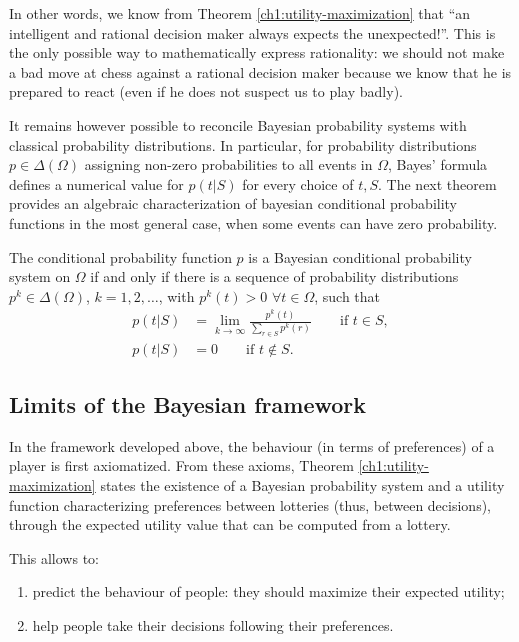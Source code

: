 In other words, we know from Theorem \ref{ch1:utility-maximization} that ``an intelligent and rational decision maker always expects the unexpected!''.
This is the only possible way to mathematically express rationality: we should not make a bad move at chess against a rational decision maker because we know that he is prepared to react (even if he does not suspect us to play badly).

It remains however possible to reconcile Bayesian probability systems with classical probability distributions. In particular, for  probability distributions $p \in \Delta(\Omega)$ assigning non-zero probabilities to all events in $\Omega$, Bayes' formula defines a numerical value for $p(t|S)$ for every choice of $t,S$.
The next theorem provides an algebraic characterization of bayesian conditional probability functions in the most general case,
when some events can have zero probability.

\begin{theorem}
The conditional probability function $p$ is a Bayesian conditional probability system on $\Omega$ if and only if there is a sequence of probability distributions $p^k \in \Delta(\Omega)$, $k = 1, 2, \ldots$, with $p^k(t) > 0$ $\forall t \in \Omega$, such that
\begin{equation}
\begin{aligned}
p(t|S) & = \lim_{k \rightarrow \infty} \frac{p^k(t)}{\sum_{r \in S} p^k(r)} \qquad \text{if $t \in S$},\\
p(t|S) & = 0  \qquad \text{if $t \not \in S$}.
\end{aligned}
\end{equation}
\end{theorem}

\subsection{Limits of the Bayesian framework}

In the framework developed above, the behaviour (in terms of preferences) of a player is first axiomatized. From these axioms, Theorem \ref{ch1:utility-maximization} states the existence of a Bayesian probability system and a utility function characterizing preferences between lotteries (thus, between decisions), through the expected utility value that can be computed from a lottery.

This allows to:
\begin{enumerate}
\item predict the behaviour of people:  they should maximize their expected utility;
\item help people take their decisions following their preferences.
\end{enumerate}

